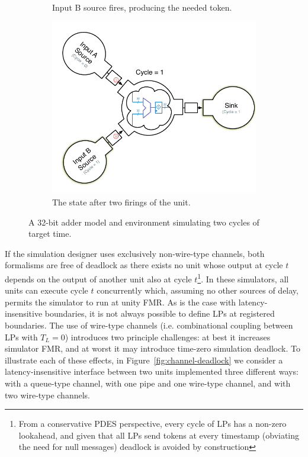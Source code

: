 \begin{figure}
\begin{subfigure}[t]{0.45\textwidth}
        \caption{Input B source fires, producing the needed token.}
    \end{subfigure}
    \begin{subfigure}[t]{0.45\textwidth}
        \includegraphics[width=\columnwidth]{figures/adder-example5.pdf}
        \caption{The state after two firings of the unit.}
    \end{subfigure}
    \centering
    \caption{A 32-bit adder model and environment simulating two cycles of target time.}
    \label{fig:adder-example}
\end{figure}

If the simulation designer uses exclusively non-wire-type channels, both
formalisms are free of deadlock as there exists no unit whose output at cycle
$t$ depends on the output of another unit also at cycle $t$\footnote{From a
conservative PDES perspective, every cycle of LPs has a non-zero lookahead, and given that
all LPs send tokens at every timestamp (obviating the need for null
messages) deadlock is avoided by construction}. In these simulators, all units
can execute cycle $t$ concurrently which, assuming no other sources of delay,
permits the simulator to run at unity FMR.  As is the case with latency-insensitive boundaries, it is not always possible to define LPs
at registered boundaries.  The use of wire-type channels (i.e. combinational
coupling between LPs with $T_{L} = 0$) introduces two principle challenges: at best it
increases simulator FMR, and at worst it may introduce time-zero simulation
deadlock. To illustrate each of these effects, in Figure~\ref{fig:channel-deadlock} we consider a
latency-insensitive interface between two units implemented three different ways: with a queue-type
channel, with one pipe and one wire-type channel, and with two wire-type channels.

